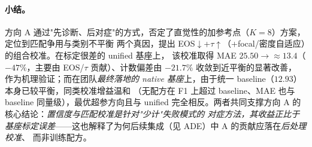 \paragraph{小结。}
方向 A 通过"先诊断、后对症"的方式，否定了直觉性的加参考点（$K{=}8$）方案，定位到匹配争用与类别不平衡
两个真因，提出 EOS$\downarrow$+$\tau\uparrow$（+focal/密度自适应）的组合校准。在标定很差的 unified 基座上，
该校准取得 MAE $25.50\to\approx13.4$（$-47\%$，主要由 EOS/$\tau$ 贡献）、计数偏差由 $-21.7\%$ 收敛到近平衡的显著改善，
作为机理验证；而在团队\emph{最终落地的 native 基座}上，由于统一 baseline（$12.93$）本身已较平衡，同类校准增益温和
（无配方在 F1 上超过 baseline、MAE 也与 baseline 同量级），最优超参方向且与 unified 完全相反。两者共同支撑方向 A 的核心结论：\emph{置信度与匹配校准是针对"少计"失败模式的
对症方法，其收益正比于基座标定误差}——这也解释了为何后续集成（见 ADE）中 A 的贡献应落在\emph{后处理校准}、
而非训练配方。
